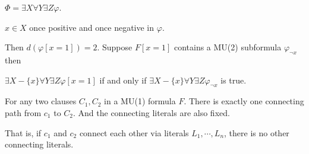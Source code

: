 $\Phi=\exists X\forall Y\exists Z \varphi$.

$x\in X$ once positive and once negative in $\varphi$.

Then $d(\varphi[x=1])=2$. Suppose $F[x=1]$ contains a MU(2) subformula $\varphi_{\neg x}$ then

$\exists X-\{x\}\forall Y\exists Z\varphi[x=1]$ if and only if $\exists X-\{x\}\forall Y\exists Z \varphi_{\neg x}$ is true.


For any two clauses $C_1, C_2$ in a MU(1) formula $F$. There is exactly one connecting path from $c_1$ to $C_2$. And the connecting literals are also fixed.

That is, if $c_1$ and $c_2$ connect each other via literals $L_1,\cdots, L_n$, there is no other connecting literals.


